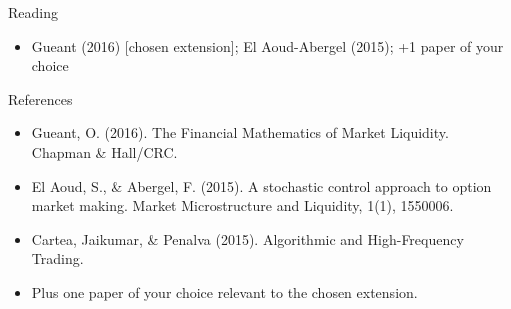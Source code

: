 \documentclass[aspectratio=169,10pt]{beamer}
\begin{document}
\begin{frame}{Reading}
\begin{itemize}
  \item Gueant (2016) [chosen extension]; El Aoud-Abergel (2015); +1 paper of your choice
\end{itemize}
\end{frame}

\begin{frame}{References}
\scriptsize\begin{itemize}\setlength{\itemsep}{3pt}
  \item Gueant, O. (2016). The Financial Mathematics of Market Liquidity. Chapman \& Hall/CRC.
  \item El Aoud, S., \& Abergel, F. (2015). A stochastic control approach to option market making. Market Microstructure and Liquidity, 1(1), 1550006.
  \item Cartea, Jaikumar, \& Penalva (2015). Algorithmic and High-Frequency Trading.
  \item Plus one paper of your choice relevant to the chosen extension.
\end{itemize}
\end{frame}
\end{document}
